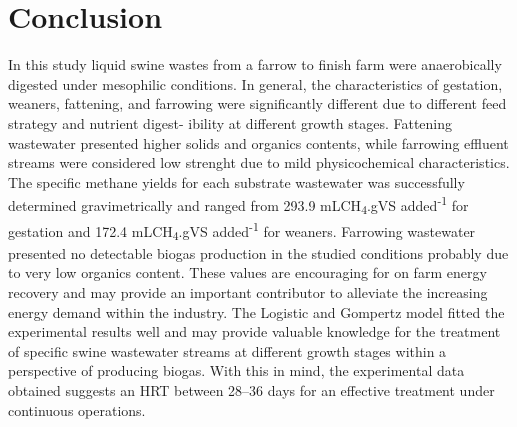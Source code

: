 \section{Conclusion}
In this study liquid swine wastes from a farrow to finish farm were anaerobically digested under mesophilic conditions. In general, the characteristics of gestation, weaners, fattening, and farrowing were significantly different due to different feed strategy and nutrient digest- ibility at different growth stages. Fattening wastewater presented higher solids and organics contents, while farrowing effluent streams were considered low strenght due to mild physicochemical characteristics. The specific methane yields for each substrate wastewater was successfully determined gravimetrically  and ranged from 293.9 mLCH\textsubscript{4}.gVS added\textsuperscript{-1} for gestation and 172.4 mLCH\textsubscript{4}.gVS added\textsuperscript{-1} for weaners. Farrowing wastewater presented no detectable biogas production in the studied conditions probably due to very low organics content. These values are encouraging for on farm energy recovery and may provide an important contributor to alleviate the increasing energy demand within the industry. The Logistic and Gompertz model fitted the experimental results well and may provide valuable knowledge for the treatment of specific swine wastewater streams at different growth stages within a perspective of producing biogas. With this in mind, the experimental data obtained suggests an HRT between 28–36 days for an effective treatment under continuous operations. 